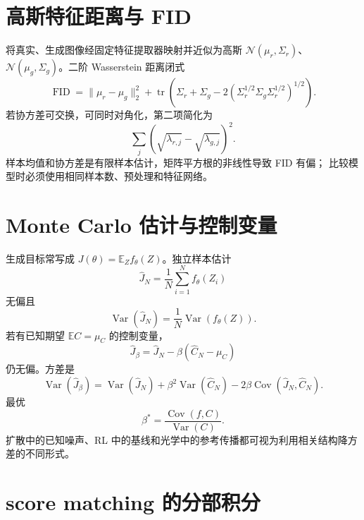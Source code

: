 \documentclass[11pt]{article}
\numberwithin{equation}{section}
\newcommand{\E}{\mathbb{E}}
\newcommand{\1}{\mathbf{1}}
\newcommand{\cN}{\mathcal{N}}
\newcommand{\tr}{\operatorname{tr}}
\newcommand{\Var}{\operatorname{Var}}
\newcommand{\Cov}{\operatorname{Cov}}
\begin{document}
\section{高斯特征距离与 FID}

将真实、生成图像经固定特征提取器映射并近似为高斯
$\cN(\mu_r,\Sigma_r)$、$\cN(\mu_g,\Sigma_g)$。二阶 Wasserstein 距离闭式
\begin{equation}
 \operatorname{FID}=
 \|\mu_r-\mu_g\|_2^2
 +\tr\left(\Sigma_r+\Sigma_g
 -2(\Sigma_r^{1/2}\Sigma_g\Sigma_r^{1/2})^{1/2}\right).
\end{equation}
若协方差可交换，可同时对角化，第二项简化为
\begin{equation}
 \sum_j(\sqrt{\lambda_{r,j}}-\sqrt{\lambda_{g,j}})^2.
\end{equation}
样本均值和协方差是有限样本估计，矩阵平方根的非线性导致 FID 有偏；
比较模型时必须使用相同样本数、预处理和特征网络。

\section{Monte Carlo 估计与控制变量}

生成目标常写成 $J(\theta)=\E_Z f_\theta(Z)$。独立样本估计
\begin{equation}
 \widehat J_N=\frac1N\sum_{i=1}^{N}f_\theta(Z_i)
\end{equation}
无偏且
\begin{equation}
 \Var(\widehat J_N)=\frac1N\Var(f_\theta(Z)).
\end{equation}
若有已知期望 $\E C=\mu_C$ 的控制变量，
\begin{equation}
 \widehat J_\beta=\widehat J_N-\beta(\widehat C_N-\mu_C)
\end{equation}
仍无偏。方差是
\begin{equation}
 \Var(\widehat J_\beta)
 =\Var(\widehat J_N)+\beta^2\Var(\widehat C_N)
 -2\beta\Cov(\widehat J_N,\widehat C_N).
\end{equation}
最优
\begin{equation}
 \beta^*=\frac{\Cov(f,C)}{\Var(C)}.
\end{equation}
扩散中的已知噪声、RL 中的基线和光学中的参考传播都可视为利用相关结构降方差的不同形式。

\section{score matching 的分部积分}
\end{document}
